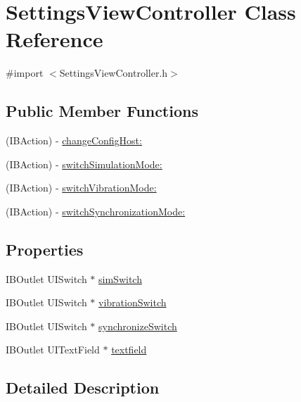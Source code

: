 \hypertarget{interface_settings_view_controller}{
\section{SettingsViewController Class Reference}
\label{interface_settings_view_controller}
}


{\ttfamily \#import $<$SettingsViewController.h$>$}

\subsection*{Public Member Functions}
\begin{DoxyCompactItemize}
\item 
(IBAction) -\/ \hyperlink{interface_settings_view_controller_a6131f48571cb3d75722cacf2888b7210}{changeConfigHost:}
\item 
(IBAction) -\/ \hyperlink{interface_settings_view_controller_aea895f2d48b7383bf0e775b7fc00c48a}{switchSimulationMode:}
\item 
(IBAction) -\/ \hyperlink{interface_settings_view_controller_a6be7811a03f5316db4ebb845ac1a5e60}{switchVibrationMode:}
\item 
(IBAction) -\/ \hyperlink{interface_settings_view_controller_ae01f0b203b30003da6864988e10747ca}{switchSynchronizationMode:}
\end{DoxyCompactItemize}
\subsection*{Properties}
\begin{DoxyCompactItemize}
\item 
IBOutlet UISwitch $\ast$ \hyperlink{interface_settings_view_controller_affbc3e3d6d03ef41c6cae283b67781ee}{simSwitch}
\item 
IBOutlet UISwitch $\ast$ \hyperlink{interface_settings_view_controller_ae13abd3540c06666a06dd34db7f87cae}{vibrationSwitch}
\item 
IBOutlet UISwitch $\ast$ \hyperlink{interface_settings_view_controller_a3fb17dcdf5ce5fb58cffa0bd6f4e3d6e}{synchronizeSwitch}
\item 
IBOutlet UITextField $\ast$ \hyperlink{interface_settings_view_controller_afada4229afbd422ca57cea7d75b370da}{textfield}
\end{DoxyCompactItemize}


\subsection{Detailed Description}


